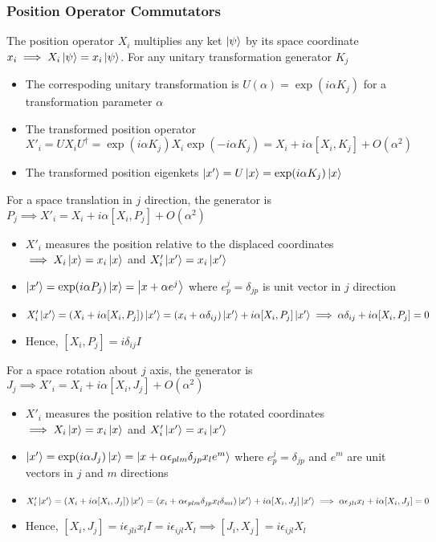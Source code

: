 \documentclass[8pt,t,mathserif,aspectratio=169]{beamer}
\begin{document}
\begin{frame}
  \frametitle{Position Operator Commutators}
  \vspace{1mm}
  The position operator $X_i$ multiplies any ket $\ket{\psi}$ by its space coordinate $x_i \implies X_i \ket{\psi} = x_i \ket{\psi}$. For any unitary transformation generator $K_j$
  \begin{itemize}
    \item The correspoding unitary transformation is $U(\alpha) = \exp(i \alpha K_j)$ for a transformation parameter $\alpha$
    \item The transformed position operator $X'_i = U X_i U^{\dagger} = \exp(i \alpha K_j) X_i \exp(-i \alpha K_j) = X_i + i \alpha [X_i,K_j] + O(\alpha^2)$
    \item The transformed position eigenkets $\ket{x'} = U \ket{x} = \exp(i \alpha K_j) \ket{x}$
  \end{itemize}
  For a space translation in $j$ direction, the generator is $P_j \implies X'_i = X_i + i \alpha [X_i,P_j] + O(\alpha^2)$
  \begin{itemize}
    \item $X'_i$ measures the position relative to the displaced coordinates $\implies X_i \ket{x} = x_i \ket{x}$ and $X'_i \ket{x'} = x_i \ket{x'}$
    \item $\ket{x'} = \exp(i \alpha P_j) \ket{x} = \ket{x + \alpha e^j}$ where $e^j_p = \delta_{jp}$ is unit vector in $j$ direction
    \item $X'_i \ket{x'} = (X_i + i \alpha [X_i,P_j])\ket{x'} = (x_i + \alpha \delta_{ij})\ket{x'} + i \alpha [X_i,P_j] \ket{x'} \implies \alpha \delta_{ij} + i \alpha [X_i,P_j] = 0$
    \item Hence, $[X_i,P_j] = i \delta_{ij} I$
  \end{itemize}
  For a space rotation about $j$ axis, the generator is $J_j \implies X'_i = X_i + i \alpha [X_i,J_j] + O(\alpha^2)$
  \begin{itemize}
    \item $X'_i$ measures the position relative to the rotated coordinates $\implies X_i \ket{x} = x_i \ket{x}$ and $X'_i \ket{x'} = x_i \ket{x'}$
    \item $\ket{x'} = \exp(i \alpha J_j) \ket{x} = \ket{x + \alpha \epsilon_{plm} \delta_{jp} x_l e^m}$ where $e^j_p = \delta_{jp}$ and $e^m$ are unit vectors in $j$ and $m$ directions
    \item $X'_i \ket{x'} = (X_i + i \alpha [X_i,J_j])\ket{x'} = (x_i + \alpha \epsilon_{plm} \delta_{jp} x_l \delta_{mi})\ket{x'} + i \alpha [X_i,J_j] \ket{x'} \implies \alpha \epsilon_{jli} x_l + i \alpha [X_i,J_j] = 0$
    \item Hence, $[X_i,J_j] = i \epsilon_{jli} x_l I = i \epsilon_{ijl} X_l \implies [J_i,X_j] = i \epsilon_{ijl} X_l$
  \end{itemize}
\end{frame}
\end{document}
